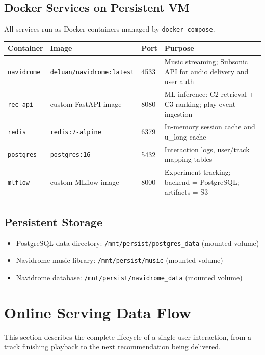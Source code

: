 \documentclass[11pt]{article}
\begin{document}
\subsection{Docker Services on Persistent VM}

All services run as Docker containers managed by \texttt{docker-compose}.

\begin{longtable}{@{}lllp{5.5cm}@{}}
\toprule
Container & Image & Port & Purpose \\
\midrule
\texttt{navidrome} & \texttt{deluan/navidrome:latest} & 4533 &
  Music streaming; Subsonic API for audio delivery and user auth \\[4pt]
\texttt{rec-api} & custom FastAPI image & 8080 &
  ML inference: C2 retrieval + C3 ranking; play event ingestion \\[4pt]
\texttt{redis} & \texttt{redis:7-alpine} & 6379 &
  In-memory session cache and u\_long cache \\[4pt]
\texttt{postgres} & \texttt{postgres:16} & 5432 &
  Interaction logs, user/track mapping tables \\[4pt]
\texttt{mlflow} & custom MLflow image & 8000 &
  Experiment tracking; backend = PostgreSQL; artifacts = S3 \\
\bottomrule
\end{longtable}

\subsection{Persistent Storage}

\begin{itemize}[leftmargin=1.5em]
  \item PostgreSQL data directory: \texttt{/mnt/persist/postgres\_data} (mounted volume)
  \item Navidrome music library: \texttt{/mnt/persist/music} (mounted volume)
  \item Navidrome database: \texttt{/mnt/persist/navidrome\_data} (mounted volume)
\end{itemize}

\section{Online Serving Data Flow}

This section describes the complete lifecycle of a single user interaction, from a track
finishing playback to the next recommendation being delivered.
\end{document}
